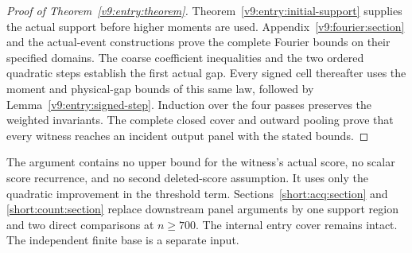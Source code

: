 \begin{proof}[Proof of Theorem~\ref{v9:entry:theorem}]
Theorem~\ref{v9:entry:initial-support} supplies the actual support before
higher moments are used. Appendix~\ref{v9:fourier:section} and the
actual-event constructions prove the complete Fourier bounds on their
specified domains. The coarse coefficient inequalities and the two
ordered quadratic steps establish the first actual gap. Every signed
cell thereafter uses the moment and physical-gap bounds of this same
law, followed by Lemma~\ref{v9:entry:signed-step}. Induction over the
four passes preserves the weighted invariants. The complete closed
cover and outward pooling prove that every witness reaches an incident
output panel with the stated bounds.
\end{proof}
The argument contains no upper bound for the witness's actual score,
no scalar score recurrence, and no second deleted-score assumption.
It uses only the quadratic improvement in the threshold term.
Sections~\ref{short:acq:section} and \ref{short:count:section} replace
downstream panel arguments by one support region and two direct
comparisons at $n\ge700$. The internal entry cover
remains intact. The independent finite base is a separate input.
